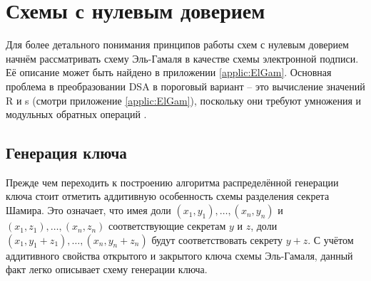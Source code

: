 \documentclass[a4paper,12pt]{article}
\theoremstyle{definition}
\begin{document}
	
	\section{Схемы с нулевым доверием}
	
	Для более детального понимания принципов работы схем с нулевым доверием начнём рассматривать схему Эль-Гамаля в качестве схемы электронной подписи. Её описание может быть найдено в приложении \ref{applic:ElGam}. Основная проблема в преобразовании DSA в пороговый вариант \--- это вычисление значений R и s (смотри приложение \ref{applic:ElGam}), поскольку они требуют умножения и модульных обратных операций \cite{paper3}.
	
		\subsection{Генерация ключа}
		
		Прежде чем переходить к построению алгоритма распределённой генерации ключа стоит отметить аддитивную особенность схемы разделения секрета Шамира. Это означает, что имея доли $(x_1, y_1), \dots,  (x_n, y_n)$ и $(x_1, z_1), \dots,  (x_n, z_n)$ соответствующие секретам $y$ и $z$, доли $(x_1, y_1+z_1), \dots,  (x_n, y_n+z_n)$ будут соответствовать секрету $y+z$. С учётом аддитивного свойства открытого и закрытого ключа схемы Эль-Гамаля, данный факт легко описывает схему генерации ключа.
\end{document}
